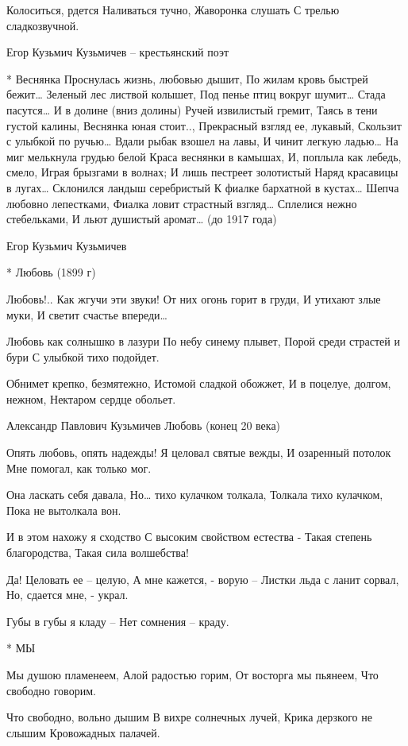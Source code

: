 Колоситься, рдется
     Наливаться тучно,
Жаворонка слушать
     С трелью сладкозвучной.

﻿Егор Кузьмич Кузьмичев – крестьянский поэт


* Веснянка
Проснулась жизнь, любовью дышит,
    По жилам кровь быстрей бежит…
Зеленый лес листвой колышет,
   Под пенье птиц вокруг шумит…
Стада пасутся… И в долине (вниз долины)
    Ручей извилистый гремит,
Таясь в тени густой калины,
    Веснянка юная стоит..,
Прекрасный взгляд ее, лукавый,
    Скользит с улыбкой по ручью…
Вдали рыбак взошел на лавы,
    И чинит легкую ладью…
На миг мелькнула грудью белой
    Краса веснянки в камышах,
И, поплыла как лебедь, смело,
    Играя брызгами в волнах;
И лишь пестреет золотистый
    Наряд красавицы в лугах…
Склонился ландыш серебристый
    К фиалке бархатной в кустах…
Шепча любовно лепестками,
    Фиалка ловит страстный взгляд…
Сплелися нежно стебельками,
    И льют душистый  аромат…
(до 1917 года)

﻿Егор Кузьмич Кузьмичев


* Любовь (1899 г)

Любовь!.. Как жгучи эти звуки!
От них огонь горит в груди,
И утихают злые муки,
И светит счастье впереди…

Любовь как солнышко в лазури
По небу синему плывет,
Порой среди страстей и бури
С улыбкой тихо подойдет.

Обнимет крепко, безмятежно,
Истомой сладкой обожжет,
И в поцелуе, долгом, нежном,
Нектаром сердце обольет.

Александр Павлович Кузьмичев
Любовь (конец 20 века)

Опять любовь, опять надежды!
Я целовал святые вежды,
И озаренный потолок
Мне помогал, как только мог.

Она ласкать себя давала,
Но… тихо кулачком толкала,
Толкала тихо кулачком,
Пока не вытолкала вон.

И в этом нахожу я сходство
С высоким свойством естества -
Такая степень благородства,
Такая сила волшебства!

Да! Целовать ее – целую,
А мне кажется, - ворую –
Листки льда с ланит сорвал,
Но, сдается мне, - украл.

Губы в губы я кладу –
Нет сомнения – краду.


* МЫ

Мы душою пламенеем,
Алой радостью горим,
От восторга мы пьянеем,
Что свободно говорим.

Что свободно, вольно дышим
В вихре солнечных лучей,
Крика дерзкого не слышим
Кровожадных палачей.

